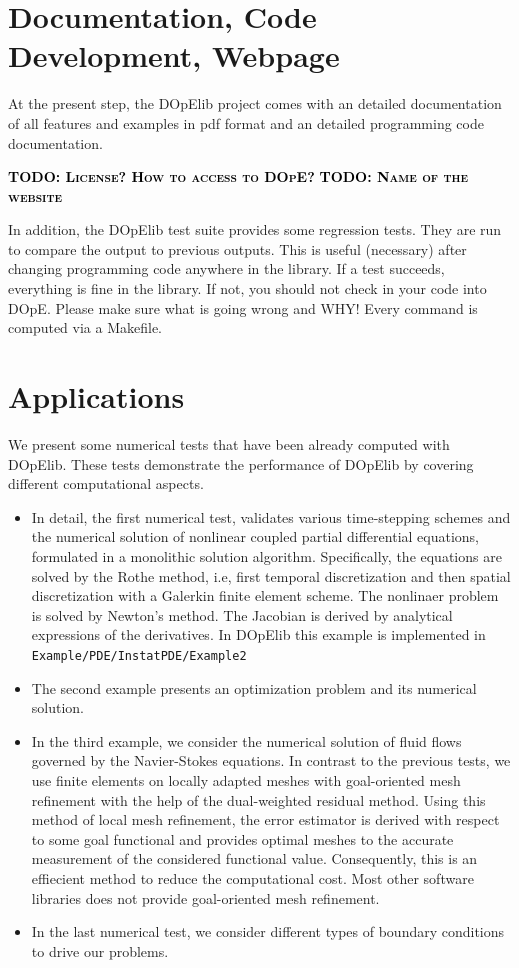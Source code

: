 \documentclass[prodmode,acmtoms]{acmsmall}
\numberwithin{equation}{section}
\newcommand{\todo}[1]{\textbf{\textsc{\textcolor{black}{TODO: #1}}}}
\begin{document}
\section{Documentation, Code Development, Webpage}
\label{documentation}
At the present step, the DOpElib project comes with 
an detailed documentation of all features and examples 
in pdf format and an detailed programming code 
documentation. 

\todo{License? How to access to DOpE?}
\todo{Name of the website}

In addition, the DOpElib test suite provides some regression tests. 
They are run to compare 
the output to previous outputs. This is useful (necessary) after 
changing programming code anywhere in the library. If a test
succeeds, everything is fine in the library. If not, you should not
check in your code into DOpE. Please make sure what is going wrong and WHY!
Every command is computed via a Makefile. 



\section{Applications}
\label{applications}
We present some numerical tests that have been already computed 
with DOpElib. These tests demonstrate the performance 
of DOpElib by covering different computational aspects. 
\begin{itemize}
\item In detail, the first numerical test, validates various time-stepping schemes
and the numerical solution of nonlinear coupled partial differential
equations, formulated in a monolithic solution algorithm. 
Specifically, the equations are solved by the Rothe method, i.e,
first temporal discretization and then spatial discretization 
with a Galerkin finite element scheme. The nonlinaer problem
is solved by Newton's method. The Jacobian is derived 
by analytical expressions of the derivatives. 
In DOpElib this example is implemented in 
\texttt{Example/PDE/InstatPDE/Example2}
\item The second example presents an
optimization problem and its numerical solution.
\item In the third example, we consider the numerical
solution of fluid flows governed by the Navier-Stokes
equations. In contrast to the previous tests, we 
use finite elements on locally adapted meshes 
with goal-oriented mesh refinement with the help
of the dual-weighted residual method. Using 
this method of local mesh refinement, the error estimator
is derived with respect to some goal functional and 
provides optimal meshes to the accurate measurement 
of the considered functional value. Consequently,
this is an effiecient method to reduce the computational 
cost. Most other 
software libraries does not provide goal-oriented 
mesh refinement.  
\item In the last numerical test, we consider 
different types of boundary conditions to drive
our problems. 
\end{itemize}
\end{document}
